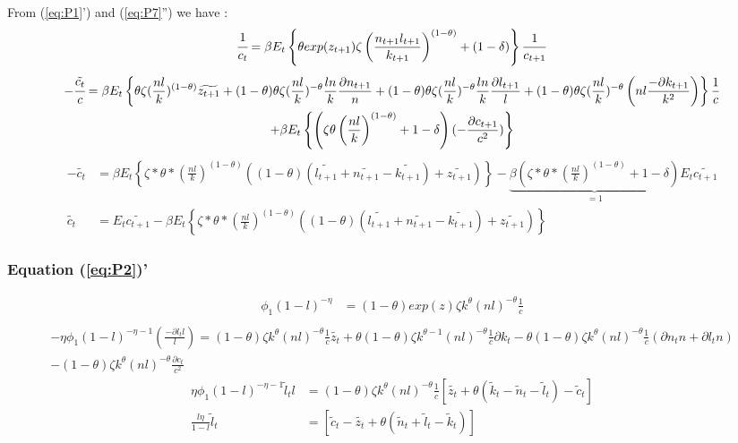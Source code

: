 \documentclass[english]{article}
\begin{document}
From (\ref{eq:P1}') and (\ref{eq:P7}'') we have :
\begin{align*}
\cfrac{1}{c_t} &= \beta E_{t}\left\{\theta exp(z_{t+1})\zeta\left(\frac{n_{t+1}l_{t+1}}{k_{t+1}}\right)^{(1-\theta)}+(1-\delta)\right\}\frac{1}{c_{t+1}} \\
\end{align*}
\begin{multline*}
-\cfrac{\tilde{c_t}}{c} = \beta E_{t}\left\{\theta\zeta(\frac{nl}{k})^{(1-\theta)}\widetilde{z_{t+1}}+(1-\theta)\theta\zeta(\frac{nl}{k})^{-\theta}\frac{ln}{k}\frac{\partial n_{t+1}}{n}+(1-\theta)\theta\zeta(\frac{nl}{k})^{-\theta}\frac{ln}{k}\frac{\partial l_{t+1}}{l}+(1-\theta)\theta\zeta(\frac{nl}{k})^{-\theta}\left(nl\frac{-\partial k_{t+1}}{k^{2}}\right)\right\}\frac{1}{c}\\+\beta E_{t}\left\{\left(\zeta\theta\left(\frac{nl}{k}\right)^{(1-\theta)}+1-\delta\right)(-\frac{\partial c_{t+1}}{c^2})\right\}
\end{multline*}
\begin{align*}
-\widetilde{c_t} &= \beta E_{t}\left\{\zeta*\theta*\left(\frac{nl}{k}\right)^{(1-\theta)}\left((1-\theta)(\widetilde{l_{t+1}}+\widetilde{n_{t+1}}-\widetilde{k_{t+1}})+\widetilde{z_{t+1}}\right)\right\}-\underbrace{\beta\left(\zeta*\theta*\left(\frac{nl}{k}\right)^{(1-\theta)}+1-\delta\right)}_{=1}E_t\widetilde{c_{t+1}}\\
\widetilde{c_t} &= E_t\widetilde{c_{t+1}}-\beta E_{t}\left\{\zeta*\theta*\left(\frac{nl}{k}\right)^{(1-\theta)}\left((1-\theta)(\widetilde{l_{t+1}}+\widetilde{n_{t+1}}-\widetilde{k_{t+1}})+\widetilde{z_{t+1}}\right)\right\}
\end{align*}

\subsubsection{Equation (\ref{eq:P2})'}
\begin{align*}
  \phi_{1}\left(1-l\right)^{-\eta} &= (1-\theta)exp(z)\zeta k^{\theta}(nl)^{-\theta}\frac{1}{c} \\
\end{align*}
\begin{multline*}
  -\eta\phi_{1}\left(1-l\right)^{-\eta-1}(\frac{-\partial l_{t}l}{l}) = (1-\theta)\zeta k^{\theta}(nl)^{-\theta}\frac{1}{c}\widetilde{z_{t}}+\theta(1-\theta)\zeta k^{\theta-1}(nl)^{-\theta}\frac{1}{c}\partial k_{t}-\theta(1-\theta)\zeta k^{\theta}(nl)^{-\theta}\frac{1}{c}\left(\partial n_{t}n+\partial l_{t}n\right)\\-(1-\theta)\zeta k^{\theta}(nl)^{-\theta}\frac{\partial c_{t}}{c^{2}}
\end{multline*}
\begin{align*}
\eta\phi_{1}\left(1-l\right)^{-\eta-1}\widetilde{l}_{t}l &=(1-\theta)\zeta k^{\theta}(nl)^{-\theta}\frac{1}{c}\left[\widetilde{z_{t}}+\theta\left(\widetilde{k}_{t}-\widetilde{n}_{t}-\widetilde{l}_{t}\right)-\widetilde{c}_{t}\right]\\
  \frac{l\eta}{1-l}\widetilde{l}_{t}&=\left[\widetilde{c}_{t}-\widetilde{z_{t}}+\theta\left(\widetilde{n}_{t}+\widetilde{l}_{t}-\widetilde{k}_{t}\right)\right]
\end{align*}
\end{document}
